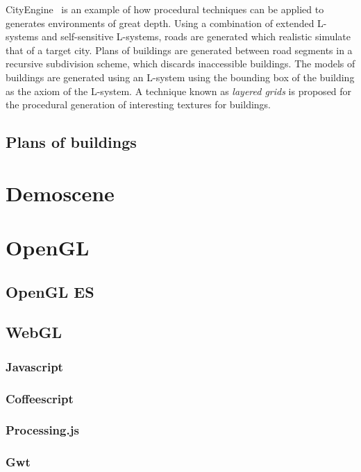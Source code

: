 \documentclass[12pt]{article}
\begin{document}
CityEngine~\cite{parish2001procedural} is an example of how procedural techniques can be applied to generates environments of great depth.
Using a combination of extended L-systems and self-sensitive L-systems, roads are generated which realistic simulate that of a target city.
Plans of buildings are generated between road segments in a recursive subdivision scheme, which discards inaccessible buildings.
The models of buildings are generated using an L-system using the bounding box of the building as the axiom of the L-system.
A technique known as \emph{layered grids} is proposed for the procedural generation of interesting textures for buildings.

\subsection{Plans of buildings}
\cite{so}

\section{Demoscene}

\section{OpenGL}

\subsection{OpenGL ES}

\subsection{WebGL}

\subsubsection{Javascript}

\subsubsection{Coffeescript}

\subsubsection{Processing.js}

\subsubsection{Gwt}



\end{document}
